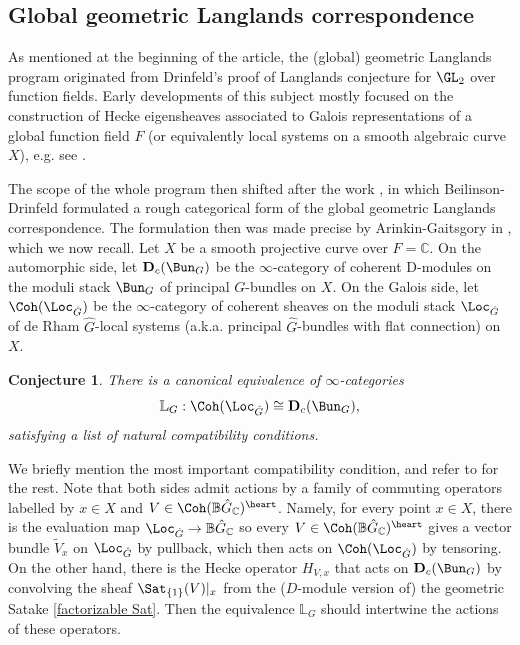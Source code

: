 \documentclass[11pt]{amsart}
\newtheorem{conjecture}[thm]{Conjecture}
\theoremstyle{definition}
\theoremstyle{definition}
\theoremstyle{definition}
\numberwithin{equation}{section}
\newcommand{\bB}{{\mathbb B}}
\newcommand{\bC}{{\mathbb C}}
\newcommand{\bL}{{\mathbb L}}
\begin{document}
\subsection{Global geometric Langlands correspondence}\label{Global GLC}
As mentioned at the beginning of the article, the (global) geometric Langlands program originated from Drinfeld's proof of Langlands conjecture for $\GL_2$ over function fields. Early developments of this subject mostly focused on the construction of Hecke eigensheaves
associated to Galois representations of a global function field $F$ (or equivalently local systems on a smooth algebraic curve $X$), e.g. see \cite{Drinfeld-GL2, Laumon-Geometric-Langlands, FGV-Geometric-Langlands-GLn}. 

The scope of the whole program then shifted after the work \cite{Beilinson-Drinfeld-Hitchin}, in which Beilinson-Drinfeld formulated a rough categorical form of the global geometric Langlands correspondence. The formulation then was made precise by  Arinkin-Gaitsgory in \cite{Arinkin-Gaitsgory-Singular-Support}, which we now recall.
Let $X$ be a smooth projective curve over $F=\bC$.
On the automorphic side, let $\mathbf{D}_c(\Bun_G)$ be the $\infty$-category of coherent D-modules on the moduli stack $\Bun_G$ of principal $G$-bundles on $X$. On the Galois side, let $\Coh(\Loc_{\hat{G}})$ be the $\infty$-category of coherent sheaves on the moduli stack $\Loc_{\hat{G}}$ of de Rham $\hat{G}$-local systems (a.k.a. principal $\hat{G}$-bundles with flat connection) on $X$.

\begin{conjecture}\label{Conj: GGLC}
There is a canonical equivalence of $\infty$-categories
\[
\bL_G:  \Coh(\Loc_{\hat{G}})\cong \mathbf{D}_c(\Bun_G),
\]
satisfying a list of natural compatibility conditions.
\end{conjecture}
We briefly mention the most important compatibility condition, and refer to \cite{Arinkin-Gaitsgory-Singular-Support} for the rest. Note that both sides admit actions by a family of commuting operators labelled by $x\in X$ and $V\in \Coh(\bB\hat{G}_\bC)^\heart$. Namely,
for every point $x\in X$, there is the evaluation map $\Loc_{\hat{G}}\to \bB\hat{G}_\bC$ so every 
$V\in \Coh(\bB\hat{G}_\bC)^\heart$ gives a vector bundle $\widetilde{V}_x$ on $\Loc_{\hat{G}}$ by pullback, which then acts on $\Coh(\Loc_{\hat{G}})$ by tensoring. On the other hand, there is the Hecke operator $H_{V,x}$ that acts on $\mathbf{D}_c(\Bun_G)$ by convolving the sheaf $\Sat_{\{1\}}(V)|_x$ from the ($D$-module version of) the geometric Satake \eqref{factorizable Sat}. Then the equivalence $\bL_G$ should intertwine the actions of these operators.
\end{document}
